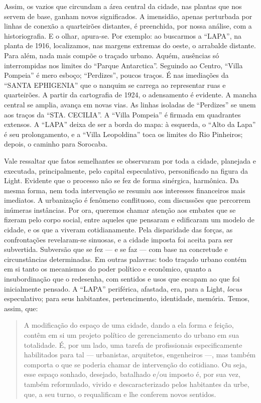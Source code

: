 \begin{refsection}
    Assim, os vazios que circundam a área central da cidade, nas plantas que nos servem de base, ganham novos significados. A imensidão, apenas perturbada por linhas de conexão a quarteirões distantes, é preenchida, por nossa análise, com a historiografia. E o olhar, apura-se. Por exemplo: ao buscarmos a ``LAPA'', na planta de 1916, localizamos, nas margens extremas do oeste, o arrabalde distante. Para além, nada mais compõe o traçado urbano. Aquém, ausências só interrompidas nos limites do ``Parque Antarctica''. Seguindo ao Centro, ``Villa Pompeia'' é mero esboço; ``Perdizes'', poucos traços.  É nas imediações da ``SANTA EPHIGENIA'' que o nanquim se carrega ao representar ruas e quarteirões. A partir da cartografia de 1924, o adensamento é evidente. A mancha central se amplia, avança em novas vias. As linhas isoladas de ``Perdizes'' se unem aos traços da ``STA. CECILIA''. A ``Villa Pompeia'' é firmada em quadrantes extensos. A ``LAPA'' deixa de ser a borda do mapa: à esquerda, o ``Alto da Lapa'' é seu prolongamento, e a ``Villa Leopoldina'' toca os limites do Rio Pinheiros; depois, o caminho para Sorocaba.  

    Vale ressaltar que fatos semelhantes se observaram por toda a cidade, planejada e executada, principalmente, pelo capital especulativo, personificado na figura da Light. Evidente que o processo não se fez de forma sinérgica, harmônica. Da mesma forma, nem toda intervenção se resumiu aos interesses financeiros mais imediatos. A urbanização é fenômeno conflituoso, com discussões que percorrem inúmeras instâncias. Por ora, queremos chamar atenção aos embates que se fizeram pelo corpo social, entre aqueles que pensaram e edificaram um modelo de cidade, e os que a viveram cotidianamente. Pela disparidade das forças, as confrontações revelaram-se sinuosas, e a cidade imposta foi aceita para ser subvertida. Subversão que se fez --- e se faz --- com base na concretude e circunstâncias determinadas. Em outras palavras: todo traçado urbano contém em si tanto os mecanismos do poder político e econômico, quanto a insubordinação que o redesenha, com sentidos e usos que escapam ao que foi inicialmente pensado. A ``LAPA'' periférica, afastada, era, para a Light, \textit{locus} especulativo; para seus habitantes, pertencimento, identidade, memória. Temos, assim, que: 

    \begin{quotation}
        A modificação do espaço de uma cidade, dando a ela forma e feição, contêm em si um projeto político de gerenciamento do urbano em sua totalidade. É, por um lado, uma tarefa de profissionais especificamente habilitados para tal --- urbanistas, arquitetos, engenheiros ---, mas também comporta o que se poderia chamar de intervenção do cotidiano. Ou seja, esse espaço sonhado, desejado, batalhado e/ou imposto é, por sua vez, também reformulado, vivido e descaracterizado pelos habitantes da urbe, que, a seu turno, o requalificam e lhe conferem novos sentidos. \cite[p.~16]{Pesavento2002Imaginario} 
    \end{quotation}


\end{refsection}
